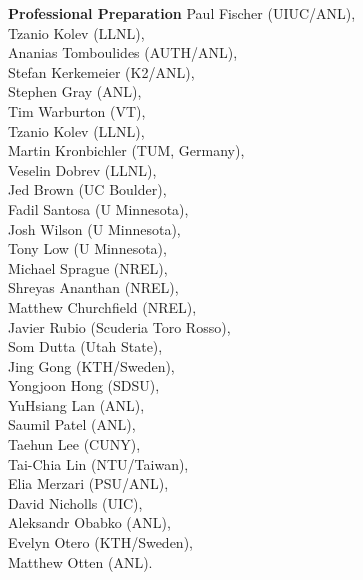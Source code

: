 \documentclass[11pt,letterpaper,english]{article}
\begin{document}
\begin{flushleft} {\bf Professional Preparation}
{Paul Fischer (UIUC/ANL),\\
Tzanio Kolev (LLNL), \\
Ananias Tomboulides (AUTH/ANL),\\
Stefan Kerkemeier (K2/ANL),\\
Stephen Gray (ANL),\\
Tim Warburton (VT), \\
Tzanio Kolev (LLNL), \\
Martin Kronbichler (TUM, Germany), \\
Veselin Dobrev (LLNL), \\
Jed Brown (UC Boulder), \\
Fadil Santosa (U Minnesota), \\
Josh Wilson (U Minnesota), \\
Tony Low (U Minnesota), \\
Michael Sprague (NREL),\\
Shreyas Ananthan (NREL), \\
Matthew Churchfield (NREL), \\
Javier Rubio (Scuderia Toro Rosso),\\
Som Dutta (Utah State),  \\
Jing Gong (KTH/Sweden), \\
Yongjoon Hong (SDSU), \\
YuHsiang Lan (ANL), \\
Saumil Patel (ANL), \\
Taehun Lee (CUNY), \\
Tai-Chia Lin  (NTU/Taiwan), \\
Elia Merzari (PSU/ANL), \\
David Nicholls (UIC), \\
Aleksandr Obabko (ANL), \\
Evelyn Otero (KTH/Sweden), \\
Matthew Otten (ANL). }


\end{flushleft}
\end{document}
